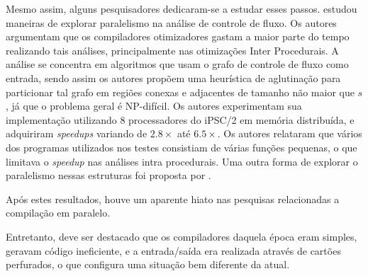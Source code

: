 Mesmo assim, alguns pesquisadores dedicaram-se a estudar esses passos.
\cite{Lee1994} estudou maneiras de explorar paralelismo na análise de controle
de fluxo. Os autores argumentam que os compiladores otimizadores gastam a maior
parte do tempo realizando tais análises, principalmente nas otimizações Inter
Procedurais. A análise se concentra em algoritmos que usam o grafo de controle
de fluxo como entrada, sendo assim os autores propõem uma heurística de aglutinação
para particionar tal grafo em regiões conexas e adjacentes de tamanho não maior que $s$, já que o
problema geral é NP-difícil. Os autores experimentam sua implementação utilizando
8 processadores do iPSC/2 em memória distribuída, e adquiriram \textit{speedups} variando de
$2.8 \times$ até $6.5\times$. Os autores relataram que vários dos programas utilizados nos
testes consistiam de várias funções pequenas, o que limitava o \textit{speedup} nas análises
intra procedurais. Uma outra forma de explorar o paralelismo nessas estruturas
foi proposta por \cite{kramer1994combining}.

Após estes resultados, houve um aparente hiato nas pesquisas relacionadas a
compilação em paralelo.




 Entretanto, deve ser destacado que os compiladores
daquela época eram simples, geravam código ineficiente, e a entrada/saída
era realizada através de cartões perfurados, o que configura uma situação
bem diferente da atual. 
